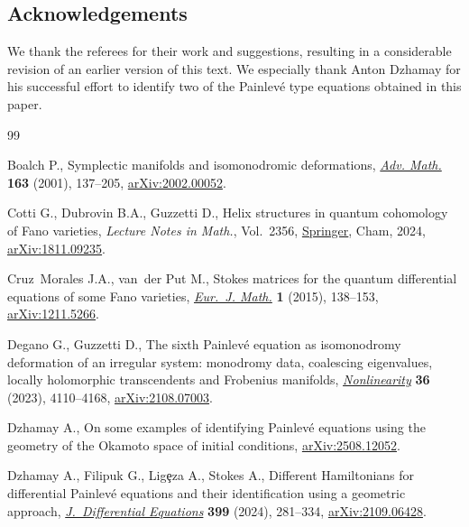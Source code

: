 \documentclass[10pt,a4paper]{amsart}
\numberwithin{equation}{section}
\begin{document}
\subsection*{Acknowledgements} We thank the referees for their work and suggestions, resulting in a considerable revision of
an earlier version of this text. We especially thank Anton Dzhamay for his successful effort to identify two of the Painlev\'e type
equations obtained in this paper.

\begin{thebibliography}{99}
\footnotesize\itemsep=0pt

Boalch P., Symplectic manifolds and isomonodromic deformations,
 \href{https://doi.org/10.1006/aima.2001.1998}{\textit{Adv. Math.}}
 \textbf{163} (2001), 137--205,
 \href{http://arxiv.org/abs/2002.00052}{arXiv:2002.00052}.

Cotti G., Dubrovin B.A., Guzzetti D., Helix structures in quantum cohomology of
 {F}ano varieties, \textit{Lecture Notes in Math.}, Vol.~2356,
 \href{https://doi.org/10.1007/978-3-031-69067-9}{Springer}, Cham, 2024,
 \href{http://arxiv.org/abs/1811.09235}{arXiv:1811.09235}.

Cruz~Morales J.A., van~der Put M., Stokes matrices for the quantum differential
 equations of some {F}ano varieties,
 \href{https://doi.org/10.1007/s40879-014-0012-6}{\textit{Eur.~J. Math.}}
 \textbf{1} (2015), 138--153,
 \href{http://arxiv.org/abs/1211.5266}{arXiv:1211.5266}.

Degano G., Guzzetti D., The sixth {P}ainlev\'e equation as isomonodromy
 deformation of an irregular system: monodromy data, coalescing eigenvalues,
 locally holomorphic transcendents and {F}robenius manifolds,
 \href{https://doi.org/10.1088/1361-6544/acdc7a}{\textit{Nonlinearity}}
 \textbf{36} (2023), 4110--4168,
 \href{http://arxiv.org/abs/2108.07003}{arXiv:2108.07003}.

Dzhamay A., {O}n some examples of identifying {P}ainlev\'e equations using the
 geometry of the {O}kamoto space of initial conditions,
 \href{http://arxiv.org/abs/2508.12052}{arXiv:2508.12052}.

Dzhamay A., Filipuk G., Lig\c{e}za A., Stokes A., Different {H}amiltonians for
 differential {P}ainlev\'e equations and their identification using a
 geometric approach,
 \href{https://doi.org/10.1016/j.jde.2024.03.029}{\textit{J.~Differential
 Equations}} \textbf{399} (2024), 281--334,
 \href{http://arxiv.org/abs/2109.06428}{arXiv:2109.06428}.


\end{thebibliography}
\end{document}
